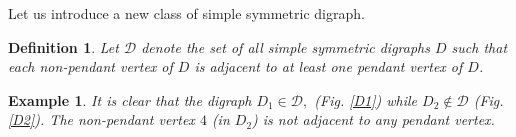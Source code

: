 \documentclass[notitlepage,12pt,reqno]{amsart}
\newtheorem{defn}[thm]{Definition}%
\newtheorem{ex}[thm]{Example}
\numberwithin{equation}{section}
\begin{document}
Let us introduce a new class of simple symmetric digraph.
\begin{defn}
Let $\mathcal{D}$ denote the set of all simple symmetric digraphs $D$  such that each non-pendant vertex of $D$ is adjacent to at least one pendant vertex of $D$.
\end{defn}
\begin{ex}
It is clear that the digraph $D_1 \in \mathcal{D},$ (Fig. \ref{D1}) while $D_2 \notin \mathcal{D}$ (Fig. \ref{D2}). The non-pendant vertex $4$ (in $D_2$) is not adjacent to any pendant vertex.
\begin{figure}[H]




\begin{tikzpicture}[x=0.75pt,y=0.75pt,yscale=-1,xscale=1]


\end{tikzpicture}
\end{figure}
\end{ex}
\end{document}
